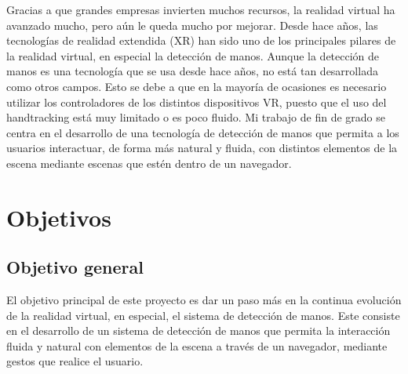 \documentclass[a4paper, 12pt]{book}
\begin{document}
Gracias a que grandes empresas invierten muchos recursos, la realidad virtual ha avanzado mucho, pero aún le queda mucho por mejorar. Desde hace años, las tecnologías de realidad extendida (XR) han sido uno de los principales pilares de la realidad virtual, en especial la detección de manos. Aunque la detección de manos es una tecnología que se usa desde hace años, no está tan desarrollada como otros campos. Esto se debe a que en la mayoría de ocasiones es necesario 
utilizar los controladores de los distintos dispositivos VR, puesto que el uso del handtracking está muy limitado o es poco fluido. 
Mi trabajo de fin de grado se centra en el desarrollo de una tecnología de detección de manos que permita a los usuarios interactuar, de forma más natural y fluida, con distintos elementos de la escena mediante escenas que estén dentro de un navegador. 

\section{Objetivos}
\label{sec:objetivos}

\subsection{Objetivo general}
\label{subsec:objetivo-general}
El objetivo principal de este proyecto es dar un paso más en la continua evolución de la realidad virtual, en especial, el sistema de detección de manos. Este consiste en el desarrollo de un sistema de detección de manos que permita la interacción fluida y natural con elementos de la escena a través de un navegador, mediante gestos que realice el usuario. 
\end{document}
